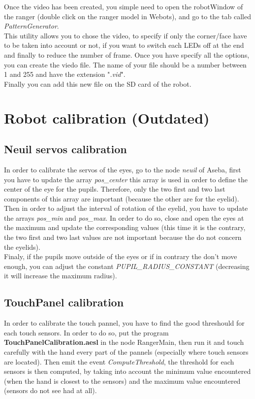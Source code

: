 \documentclass[a4paper,11pt]{report}
\begin{document}
Once the video has been created, you simple need to open the robotWindow of the ranger (double click on the ranger model in Webots), and go to the tab called \textit{PatternGenerator}.\\

This utility allows you to chose the video, to specify if only the corner/face have to be taken into account or not, if you want to switch each LEDs off at the end and finally to reduce the number of frame. Once you have specify all the options, you can create the viedo file. The name of your file should be a number between 1 and 255 and have the extension "\textit{.vid}".\\

Finally you can add this new file on the SD card of the robot.\\

\section{Robot calibration (Outdated)}
\subsection{Neuil servos calibration}
In order to calibrate the servos of the eyes, go to the node \textit{neuil} of Aseba, first you have to update the array \textit{pos\_center} this array is used in order to define the center of the eye for the pupils. Therefore,  only the two first and two last components of this array are important (because the other are for the eyelid).\\

Then in order to adjust the interval of rotation of the eyelid, you have to update the arrays \textit{pos\_min} and \textit{pos\_max}. In order to do so, close and open the eyes at the maximum and update the corresponding values (this time it is the contrary, the two first and two last values are not important because the do not concern the eyelids).\\

Finaly, if the pupils move outside of the eyes or if in contrary the don't move enough, you can adjust the constant \textit{PUPIL\_RADIUS\_CONSTANT} (decreasing it will increase the maximum radius).\\ 

\subsection{TouchPanel calibration}
In order to calibrate the touch pannel, you have to find the good threshould for each touch sensors. In order to do so, put the program \textbf{TouchPanelCalibration.aesl} in the node RangerMain, then run it and touch carefully with the hand every part of the pannels (especially where touch sensors are located). Then emit the event \textit{ComputeThreshold}, the threshold for each sensors is then computed, by taking into account the minimum value encountered (when the hand is closest to the sensors) and the maximum value encountered (sensors do not see had at all).\\
\end{document}
